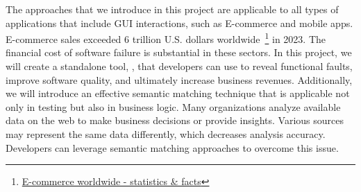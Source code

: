 \noindent
The approaches that we introduce in this project are applicable to all types of applications that include GUI interactions, such as E-commerce and mobile apps.
E-commerce sales exceeded 6 trillion U.S. dollars worldwide~\footnote{\href{https://www.statista.com/topics/871/online-shopping/}{E-commerce worldwide - statistics \& facts}} in 2023.
The financial cost of software failure is substantial in these sectors.
In this project, we will create a standalone tool, \rltool, that developers can use to reveal functional faults, improve software quality, and ultimately increase business revenues.
%
Additionally, we will introduce an effective semantic matching technique that is applicable not only in testing but also in business logic.
Many organizations analyze available data on the web to make business decisions or provide insights. 
Various sources may represent the same data differently, which decreases analysis accuracy. 
Developers can leverage semantic matching approaches to overcome this issue.
